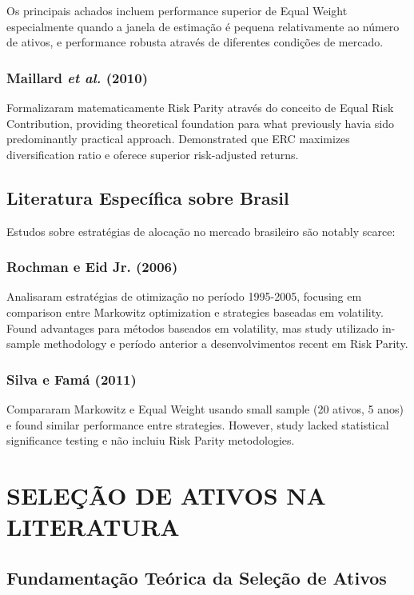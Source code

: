 Os principais achados incluem performance superior de Equal Weight especialmente quando a janela de estimação é pequena relativamente ao número de ativos, e performance robusta através de diferentes condições de mercado.

\subsubsection{Maillard \textit{et al.} (2010)}

Formalizaram matematicamente Risk Parity através do conceito de Equal Risk Contribution, providing theoretical foundation para what previously havia sido predominantly practical approach. Demonstrated que ERC maximizes diversification ratio e oferece superior risk-adjusted returns.

\subsection{Literatura Específica sobre Brasil}

Estudos sobre estratégias de alocação no mercado brasileiro são notably scarce:

\subsubsection{Rochman e Eid Jr. (2006)}

Analisaram estratégias de otimização no período 1995-2005, focusing em comparison entre Markowitz optimization e strategies baseadas em volatility. Found advantages para métodos baseados em volatility, mas study utilizado in-sample methodology e período anterior a desenvolvimentos recent em Risk Parity.

\subsubsection{Silva e Famá (2011)}

Compararam Markowitz e Equal Weight usando small sample (20 ativos, 5 anos) e found similar performance entre strategies. However, study lacked statistical significance testing e não incluiu Risk Parity metodologies.

\section{SELEÇÃO DE ATIVOS NA LITERATURA}

\subsection{Fundamentação Teórica da Seleção de Ativos}

